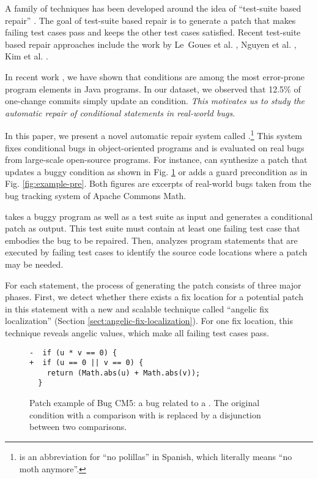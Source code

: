 A family of techniques has been developed around the idea of ``test-suite based repair'' \cite{le2012genprog}.
The goal of test-suite based repair is to generate a patch that makes failing test cases pass and keeps the other test cases satisfied. Recent test-suite based repair approaches include the work by Le~Goues et al. \cite{le2012genprog}, Nguyen et al. \cite{nguyen2013semfix}, Kim et al. \cite{Kim2013}. 

In recent work \cite{Martinez2013}, we have shown that \ourif conditions are among the most error-prone program elements in Java programs. 
In our dataset, we observed that 12.5\% of one-change commits simply update an \ourif condition. \emph{This motivates us to study the automatic repair of conditional statements in real-world bugs}. 

In this paper, we present a novel automatic repair system called \nopol.\footnote{\nopol is an abbreviation for ``no polillas'' in Spanish, which literally means ``no moth anymore''.} This system fixes conditional bugs in object-oriented programs and is evaluated on real bugs from large-scale open-source programs. For instance, \nopol can synthesize a patch that updates a buggy \ourif condition as shown in Fig. \ref{fig:example-buggy} or adds a guard precondition as in Fig. \ref{fig:example-pre}. Both figures are excerpts of real-world bugs taken from the bug tracking system of Apache Commons Math.
 
\nopol takes a buggy program as well as a test suite as input and generates a conditional patch as output. This test suite must contain at least one failing test case that embodies the bug to be repaired. Then, \nopol analyzes program statements that are executed by failing test cases to identify the source code locations where a patch may be needed.

For each statement, the process of generating the patch consists of three major phases. 
First, we detect whether there exists a fix location for a potential patch in this statement with a new and scalable technique called ``angelic fix localization'' (Section \ref{sect:angelic-fix-localization}). For one fix location, this technique reveals angelic values, which make all failing test cases pass. 

\begin{figure}[!t]
\centering
\noindent\begin{minipage}{0.45\textwidth}
\begin{lstlisting}
-  if (u * v == 0) { 
+  if (u == 0 || v == 0) {
    return (Math.abs(u) + Math.abs(v));
  }  
\end{lstlisting}
\end{minipage}
\caption{Patch example of Bug CM5: a bug related to a \buggycondition. The original condition with a comparison with \mycode{==} is replaced by a disjunction between two comparisons.}
\label{fig:example-buggy}
\end{figure}

